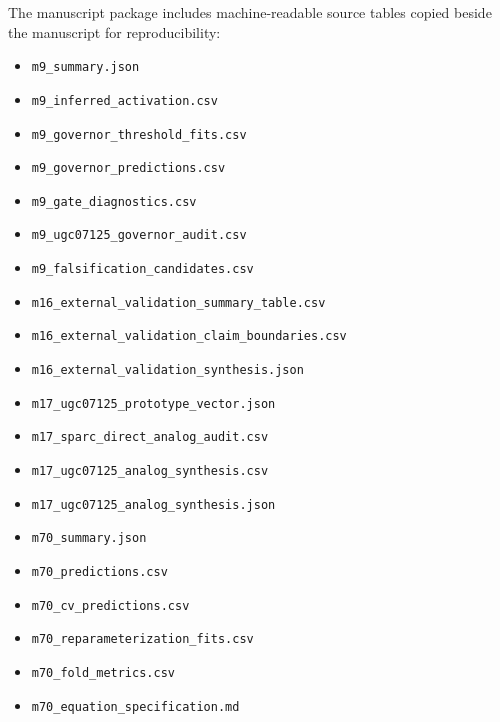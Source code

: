 \documentclass[11pt]{article}
\begin{document}
\begin{sloppypar}
The manuscript package includes machine-readable source tables copied beside the manuscript for reproducibility:
\begin{itemize}
\item \texttt{m9\_summary.json}
\item \texttt{m9\_inferred\_activation.csv}
\item \texttt{m9\_governor\_threshold\_fits.csv}
\item \texttt{m9\_governor\_predictions.csv}
\item \texttt{m9\_gate\_diagnostics.csv}
\item \texttt{m9\_ugc07125\_governor\_audit.csv}
\item \texttt{m9\_falsification\_candidates.csv}
\item \texttt{m16\_external\_validation\_summary\_table.csv}
\item \texttt{m16\_external\_validation\_claim\_boundaries.csv}
\item \texttt{m16\_external\_validation\_synthesis.json}
\item \texttt{m17\_ugc07125\_prototype\_vector.json}
\item \texttt{m17\_sparc\_direct\_analog\_audit.csv}
\item \texttt{m17\_ugc07125\_analog\_synthesis.csv}
\item \texttt{m17\_ugc07125\_analog\_synthesis.json}
\item \texttt{m70\_summary.json}
\item \texttt{m70\_predictions.csv}
\item \texttt{m70\_cv\_predictions.csv}
\item \texttt{m70\_reparameterization\_fits.csv}
\item \texttt{m70\_fold\_metrics.csv}
\item \texttt{m70\_equation\_specification.md}
\end{itemize}
\end{sloppypar}
\end{document}
